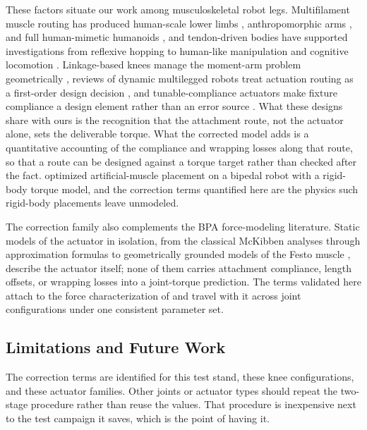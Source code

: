 \documentclass[utf8]{FrontiersinHarvard} %
\begin{document}
These factors situate our work among musculoskeletal robot legs. Multifilament muscle routing has produced human-scale lower limbs \citep{kurumaya_musculoskeletal_2016}, anthropomorphic arms \citep{hitzmann_anthropomorphic_2018}, and full human-mimetic humanoids \citep{asano_musculoskeletal_2019}, and tendon-driven bodies have supported investigations from reflexive hopping \citep{liu_robotic_2018} to human-like manipulation \citep{chen_realizing_2019} and cognitive locomotion \citep{schilling_adaptive_2022}. Linkage-based knees manage the moment-arm problem geometrically \citep{romero_four-bar_2020}, reviews of dynamic multilegged robots treat actuation routing as a first-order design decision \citep{he_mechanism_2020}, and tunable-compliance actuators make fixture compliance a design element rather than an error source \citep{leibach_development_2020}. What these designs share with ours is the recognition that the attachment route, not the actuator alone, sets the deliverable torque. What the corrected model adds is a quantitative accounting of the compliance and wrapping losses along that route, so that a route can be designed against a torque target rather than checked after the fact. \citet{morrow_optimization_2020} optimized artificial-muscle placement on a bipedal robot with a rigid-body torque model, and the correction terms quantified here are the physics such rigid-body placements leave unmodeled.

The correction family also complements the BPA force-modeling literature. Static models of the actuator in isolation, from the classical McKibben analyses \citep{chou_measurement_1996} through approximation formulas \citep{sarosi_new_2012} to geometrically grounded models of the Festo muscle \citep{martens_modeling_2017, tondu_static_2022}, describe the actuator itself; none of them carries attachment compliance, length offsets, or wrapping losses into a joint-torque prediction. The terms validated here attach to the force characterization of \citet{bolen_2026} and travel with it across joint configurations under one consistent parameter set.

\subsection{Limitations and Future Work}\label{sec:limitations}

 The correction terms are identified for this test stand, these knee configurations, and these actuator families. Other joints or actuator types should repeat the two-stage procedure rather than reuse the values. That procedure is inexpensive next to the test campaign it saves, which is the point of having it.
\end{document}
